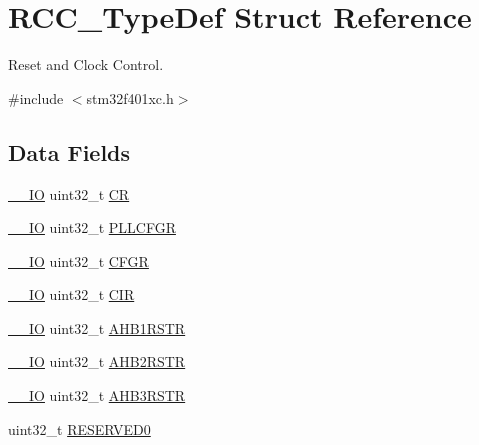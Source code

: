 \hypertarget{struct_r_c_c___type_def}{}\section{R\+C\+C\+\_\+\+Type\+Def Struct Reference}
\label{struct_r_c_c___type_def}


Reset and Clock Control.  




{\ttfamily \#include $<$stm32f401xc.\+h$>$}

\subsection*{Data Fields}
\begin{DoxyCompactItemize}
\item 
\hyperlink{core__sc300_8h_aec43007d9998a0a0e01faede4133d6be}{\+\_\+\+\_\+\+IO} uint32\+\_\+t \hyperlink{struct_r_c_c___type_def_ab40c89c59391aaa9d9a8ec011dd0907a}{CR}
\item 
\hyperlink{core__sc300_8h_aec43007d9998a0a0e01faede4133d6be}{\+\_\+\+\_\+\+IO} uint32\+\_\+t \hyperlink{struct_r_c_c___type_def_ae6ff257862eba6b4b367feea786bf1fd}{P\+L\+L\+C\+F\+GR}
\item 
\hyperlink{core__sc300_8h_aec43007d9998a0a0e01faede4133d6be}{\+\_\+\+\_\+\+IO} uint32\+\_\+t \hyperlink{struct_r_c_c___type_def_a26f1e746ccbf9c9f67e7c60e61085ec1}{C\+F\+GR}
\item 
\hyperlink{core__sc300_8h_aec43007d9998a0a0e01faede4133d6be}{\+\_\+\+\_\+\+IO} uint32\+\_\+t \hyperlink{struct_r_c_c___type_def_a907d8154c80b7e385478943f90b17a3b}{C\+IR}
\item 
\hyperlink{core__sc300_8h_aec43007d9998a0a0e01faede4133d6be}{\+\_\+\+\_\+\+IO} uint32\+\_\+t \hyperlink{struct_r_c_c___type_def_a46c20c598e9e12f919f0ea47ebcbc90f}{A\+H\+B1\+R\+S\+TR}
\item 
\hyperlink{core__sc300_8h_aec43007d9998a0a0e01faede4133d6be}{\+\_\+\+\_\+\+IO} uint32\+\_\+t \hyperlink{struct_r_c_c___type_def_a78a5aa9dd5694c48a7d8e66888a46450}{A\+H\+B2\+R\+S\+TR}
\item 
\hyperlink{core__sc300_8h_aec43007d9998a0a0e01faede4133d6be}{\+\_\+\+\_\+\+IO} uint32\+\_\+t \hyperlink{struct_r_c_c___type_def_a28560c5bfeb45326ea7f2019dba57bea}{A\+H\+B3\+R\+S\+TR}
\item 
uint32\+\_\+t \hyperlink{struct_r_c_c___type_def_af86c61a5d38a4fc9cef942a12744486b}{R\+E\+S\+E\+R\+V\+E\+D0}
\item 

\end{DoxyCompactItemize}
